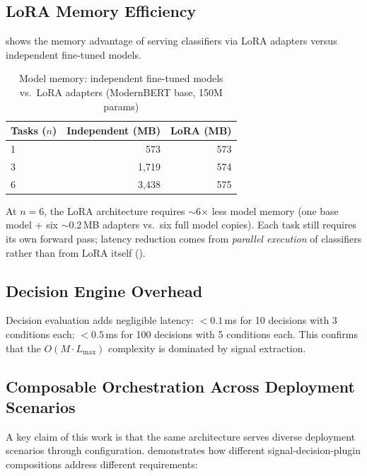 \subsection{LoRA Memory Efficiency}

 shows the memory advantage of serving classifiers via LoRA adapters versus independent fine-tuned models.

\begin{table}[h]
\centering
\caption{Model memory: independent fine-tuned models vs.\ LoRA adapters (ModernBERT base, 150M params)}
\label{tab:lora_memory}
\begin{tabular}{lrr}
\toprule
\textbf{Tasks ($n$)} & \textbf{Independent (MB)} & \textbf{LoRA (MB)} \\
\midrule
1 & 573   & 573 \\
3 & 1{,}719 & 574 \\
6 & 3{,}438 & 575 \\
\bottomrule
\end{tabular}
\end{table}

At $n = 6$, the LoRA architecture requires $\sim$6$\times$ less model memory (one base model + six $\sim$0.2\,MB adapters vs.\ six full model copies).
Each task still requires its own forward pass; latency reduction comes from \emph{parallel execution} of classifiers rather than from LoRA itself ().

\subsection{Decision Engine Overhead}

Decision evaluation adds negligible latency:
$< 0.1$\,ms for 10 decisions with 3 conditions each;
$< 0.5$\,ms for 100 decisions with 5 conditions each.
This confirms that the $O(M \cdot L_\text{max})$ complexity is dominated by signal extraction.

\subsection{Composable Orchestration Across Deployment Scenarios}

A key claim of this work is that the same architecture serves diverse deployment scenarios through configuration.
 demonstrates how different signal-decision-plugin compositions address different requirements:


